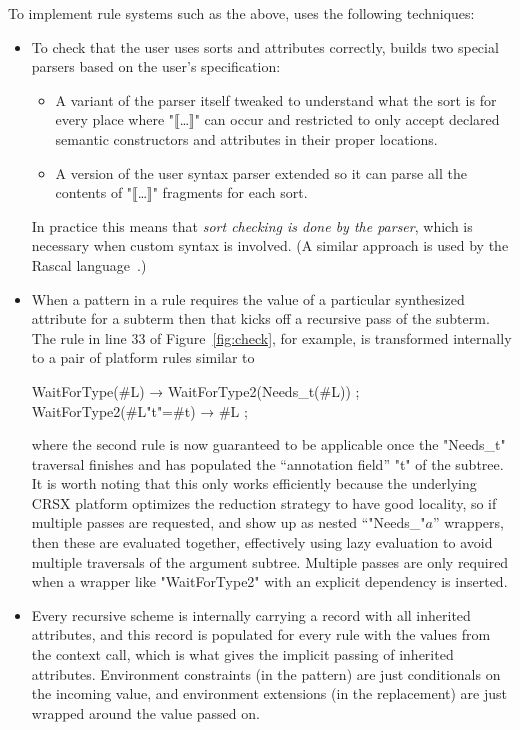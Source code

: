 \documentclass[letterpaper]{article}
\begin{document}
To implement rule systems such as the above, \HAX uses the following techniques:
\begin{itemize}

\item To check that the user uses sorts and attributes correctly, \HAX builds two special parsers
  based on the user's specification:
  \begin{itemize}

  \item A variant of the \HAX parser itself tweaked to understand what the sort is for every place
    where "⟦…⟧" can occur and restricted to only accept declared semantic constructors and
    attributes in their proper locations.

  \item A version of the user syntax parser extended so it can parse all the contents of "⟦…⟧"
    fragments for each sort.

  \end{itemize}
  In practice this means that \emph{sort checking is done by the parser}, which is necessary when
  custom syntax is involved. (A similar approach is used by the Rascal
  language~\cite{Bos+:eptcs2011}.)

\item When a pattern in a rule requires the value of a particular synthesized attribute for a
  subterm then that kicks off a recursive pass of the subterm. The rule in line 33 of
  Figure~\ref{fig:check}, for example, is transformed internally to a pair of platform rules similar
  to
  \begin{hacs}
      WaitForType(#L)  →    WaitForType2(Needs_t(#L)) ;
      WaitForType2(#L{"t"=#t}) →       #L ;
  \end{hacs}
  where the second rule is now guaranteed to be applicable once the "Needs_t" traversal finishes and
  has populated the ``annotation field'' "t" of the subtree.  It is worth noting that this only
  works efficiently because the underlying CRSX platform optimizes the reduction strategy to have
  good locality, so if multiple passes are requested, and show up as nested ``"Needs_"$a$''
  wrappers, then these are evaluated together, effectively using lazy evaluation to avoid multiple
  traversals of the argument subtree. Multiple passes are only required when a wrapper like
  "WaitForType2" with an explicit dependency is inserted.

\item Every recursive scheme is internally carrying a record with all inherited attributes, and this
  record is populated for every rule with the values from the context call, which is what gives the
  implicit passing of inherited attributes. Environment constraints (in the pattern) are just
  conditionals on the incoming value, and environment extensions (in the replacement) are just
  wrapped around the value passed on.

\end{itemize}
\end{document}
